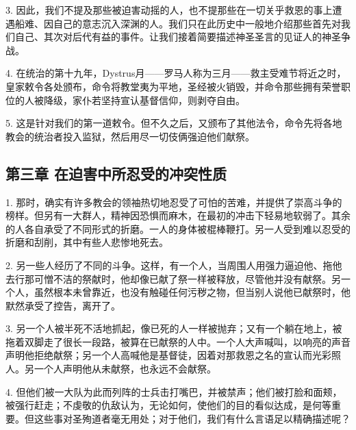 3. 因此，我们不提及那些被迫害动摇的人，也不提那些在一切关乎救恩的事上遭遇船难、因自己的意志沉入深渊的人。我们只在此历史中一般地介绍那些首先对我们自己、其次对后代有益的事件。让我们接着简要描述神圣圣言的见证人的神圣争战。\par

4. 在统治的第十九年，Dystrus月——罗马人称为三月——救主受难节将近之时，皇家敕令各处颁布，命令将教堂夷为平地，圣经被火销毁，并命令那些拥有荣誉职位的人被降级，家仆若坚持宣认基督信仰，则剥夺自由。\par

5. 这是针对我们的第一道敕令。但不久之后，又颁布了其他法令，命令先将各地教会的统治者投入监狱，然后用尽一切伎俩强迫他们献祭。\par


\subsection{第三章 在迫害中所忍受的冲突性质}

1. 那时，确实有许多教会的领袖热切地忍受了可怕的苦难，并提供了崇高斗争的榜样。但另有一大群人，精神因恐惧而麻木，在最初的冲击下轻易地软弱了。其余的人各自承受了不同形式的折磨。一人的身体被棍棒鞭打。另一人受到难以忍受的折磨和刮削，其中有些人悲惨地死去。\par

2. 另一些人经历了不同的斗争。这样，有一个人，当周围人用强力逼迫他、拖他去行那可憎不洁的祭献时，他却像已献了祭一样被释放，尽管他并没有献祭。另一个人，虽然根本未曾靠近，也没有触碰任何污秽之物，但当别人说他已献祭时，他默然承受了控告，离开了。\par

3. 另一个人被半死不活地抓起，像已死的人一样被抛弃；又有一个躺在地上，被拖着双脚走了很长一段路，被算在已献祭的人中。一个人大声喊叫，以响亮的声音声明他拒绝献祭；另一个人高喊他是基督徒，因着对那救恩之名的宣认而光彩照人。另一个人声明他从未献祭，也永远不会献祭。\par

4. 但他们被一大队为此而列阵的士兵击打嘴巴，并被禁声；他们被打脸和面颊，被强行赶走；不虔敬的仇敌认为，无论如何，使他们的目的看似达成，是何等重要。但这些事对圣殉道者毫无用处；对于他们，我们有什么言语足以精确描述呢？\par


